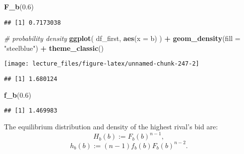 \documentclass[
]{book}
\newenvironment{Shaded}{\begin{snugshade}}{\end{snugshade}}
\newcommand{\AttributeTok}[1]{\textcolor[rgb]{0.13,0.29,0.53}{#1}}
\newcommand{\CommentTok}[1]{\textcolor[rgb]{0.56,0.35,0.01}{\textit{#1}}}
\newcommand{\FloatTok}[1]{\textcolor[rgb]{0.00,0.00,0.81}{#1}}
\newcommand{\FunctionTok}[1]{\textcolor[rgb]{0.13,0.29,0.53}{\textbf{#1}}}
\newcommand{\NormalTok}[1]{#1}
\newcommand{\OtherTok}[1]{\textcolor[rgb]{0.56,0.35,0.01}{#1}}
\newcommand{\SpecialCharTok}[1]{\textcolor[rgb]{0.81,0.36,0.00}{\textbf{#1}}}
\newcommand{\StringTok}[1]{\textcolor[rgb]{0.31,0.60,0.02}{#1}}
\begin{document}
\begin{Shaded}
\begin{Highlighting}[]
\FunctionTok{F\_b}\NormalTok{(}\FloatTok{0.6}\NormalTok{)}
\end{Highlighting}
\end{Shaded}

\begin{verbatim}
## [1] 0.7173038
\end{verbatim}

\begin{Shaded}
\begin{Highlighting}[]
\CommentTok{\# probability density}
\FunctionTok{ggplot}\NormalTok{(}
\NormalTok{  df\_first, }
  \FunctionTok{aes}\NormalTok{(}\AttributeTok{x =}\NormalTok{ b)}
\NormalTok{  ) }\SpecialCharTok{+} 
  \FunctionTok{geom\_density}\NormalTok{(}\AttributeTok{fill =} \StringTok{"steelblue"}\NormalTok{) }\SpecialCharTok{+} 
  \FunctionTok{theme\_classic}\NormalTok{()}
\end{Highlighting}
\end{Shaded}

\begin{center}\texttt{[image: lecture\_files/figure-latex/unnamed-chunk-247-2]} \end{center}

\begin{Shaded}
\end{Shaded}

\begin{verbatim}
## [1] 1.680124
\end{verbatim}

\begin{Shaded}
\begin{Highlighting}[]
\FunctionTok{f\_b}\NormalTok{(}\FloatTok{0.6}\NormalTok{)}
\end{Highlighting}
\end{Shaded}

\begin{verbatim}
## [1] 1.469983
\end{verbatim}

The equilibrium distribution and density of the highest rival's bid are:
\[
H_b(b) := F_b(b)^{n - 1},
\]
\[
h_b(b) := (n - 1) f_b(b) F_b(b)^{n - 2}.
\]
\end{document}
